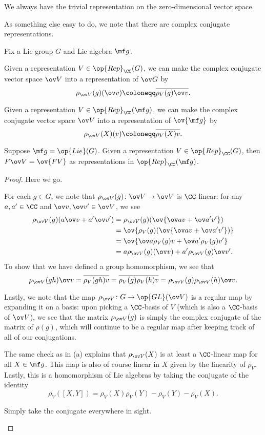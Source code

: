 \documentclass[../notes.tex]{subfiles}
\begin{document}
\begin{example}
	We always have the trivial representation on the zero-dimensional vector space.
\end{example}
As something else easy to do, we note that there are complex conjugate representations.
\begin{lemma}
	Fix a Lie group $G$ and Lie algebra $\mf g$.
	\begin{listalph}
		\item Given a representation $V\in\op{Rep}_\CC(G)$, we can make the complex conjugate vector space $\ov V$ into a representation of $\ov G$ by
		\[\rho_{\ov V}(g)(\ov v)\coloneqq\overline{\rho_V(g)\ov v}.\]
		\item Given a representation $V\in\op{Rep}_\CC(\mf g)$, we can make the complex conjugate vector space $\ov V$ into a representation of $\ov{\mf g}$ by
		\[\rho_{\ov V}(X)(v)\coloneqq\overline{\rho_V(X)v}.\]
		\item Suppose $\mf g=\op{Lie}(G)$. Given a representation $V\in\op{Rep}_\CC(G)$, then $F\ov V=\ov{FV}$ as representations in $\op{Rep}_\CC(\mf g)$.
	\end{listalph}
\end{lemma}
\begin{proof}
	Here we go.
	\begin{listalph}
		\item For each $g\in G$, we note that $\rho_{\ov V}(g)\colon\ov V\to\ov V$ is $\CC$-linear: for any $a,a'\in\CC$ and $\ov v,\ov v'\in\ov V$, we see
		\begin{align*}
			\rho_{\ov V}(g)(a\ov v+a'\ov v') &= \rho_{\ov V}(g)(\ov{\ov av+\ov a'v'}) \\
			&= \ov{\rho_V(g)(\ov{\ov av+\ov a'v'})} \\
			&= \ov{\ov a\rho_V(g)v+\ov a'\rho_V(g)v'} \\
			&= a\rho_{\ov V}(g)(\ov v)+a'\rho_{\ov V}(g)\ov v'.
		\end{align*}
		To show that we have defined a group homomorphism, we see that
		\[\rho_{\ov V}(gh)\ov v=\overline{\rho_V(gh)v}=\overline{\rho_V(g)\rho_V(h)v}=\rho_{\ov V}(g)\rho_{\ov V}(h)\ov v.\]

		Lastly, we note that the map $\rho_{\ov V}\colon G\to\op{GL}(\ov V)$ is a regular map by expanding it on a basis: upon picking a $\CC$-basis of $V$ (which is also a $\CC$-basis of $\ov V$), we see that the matrix $\rho_{\ov V}(g)$ is simply the complex conjugate of the matrix of $\rho(g)$, which will continue to be a regular map after keeping track of all of our conjugations.

		\item The same check as in (a) explains that $\rho_{\ov V}(X)$ is at least a $\CC$-linear map for all $X\in\mf g$. This map is also of course linear in $X$ given by the linearity of $\rho_V$. Lastly, this is a homomorphism of Lie algebras by taking the conjugate of the identity
		\[\rho_V([X,Y])=\rho_V(X)\rho_V(Y)-\rho_V(Y)-\rho_V(X).\]
		
		\item Simply take the conjugate everywhere in sight.
		\qedhere
	\end{listalph}
\end{proof}
\end{document}
